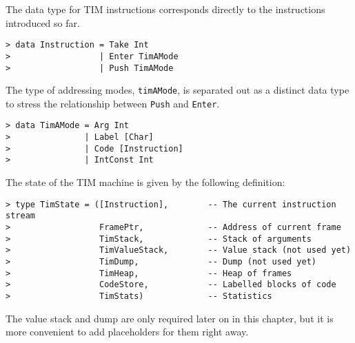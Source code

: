 The data type for TIM instructions corresponds directly to the instructions
introduced so far.
\begin{verbatim}
> data Instruction = Take Int
>                  | Enter TimAMode
>                  | Push TimAMode
\end{verbatim}
%
%
%
The type of addressing modes, \mbox{\tt timAMode},
is separated out as a distinct data type to stress the
relationship between \mbox{\tt Push} and \mbox{\tt Enter}.
\begin{verbatim}
> data TimAMode = Arg Int
>               | Label [Char]
>               | Code [Instruction]
>               | IntConst Int
\end{verbatim}
%
%
%
%
The state of the TIM machine is given by the following definition:
\begin{verbatim}
> type TimState = ([Instruction],        -- The current instruction stream
>                  FramePtr,             -- Address of current frame
>                  TimStack,             -- Stack of arguments
>                  TimValueStack,        -- Value stack (not used yet)
>                  TimDump,              -- Dump (not used yet)
>                  TimHeap,              -- Heap of frames
>                  CodeStore,            -- Labelled blocks of code
>                  TimStats)             -- Statistics
\end{verbatim}
%
The value stack and dump
are only required later on in this chapter, but it
is more convenient to add placeholders for them right away.


